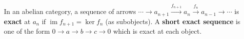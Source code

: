 In an abelian category, a sequence of arrows $\cdots \rightarrow a_{n+1} \xrightarrow{f_{n+1}} a_n \xrightarrow{f_n} a_{n-1} \rightarrow \cdots$ is \textbf{exact} at $a_n$ if $\operatorname{im} f_{n+1} = \ker f_n$ (as subobjects). A \textbf{short exact sequence} is one of the form $0 \rightarrow a \rightarrow b \rightarrow c \rightarrow 0$ which is exact at each object.